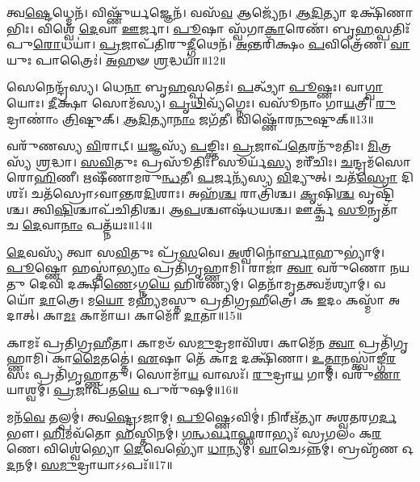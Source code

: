 𑌤𑍍𑌵\-\ul{𑌷𑍍𑌟𑍇}\-𑌧𑍍𑌮𑍇𑌨᳴। 
𑌵𑌿𑌷𑍍𑌣𑍁᳴𑌰𑍍\mbox{}\-\ul{𑌯}\-𑌜𑍍𑌞𑍇𑌨᳴। 
𑌵𑌸᳴\-\ul{𑌵} 𑌆𑌜𑍍𑌯𑍇᳴𑌨। 
\-\ul{𑌆}\-\-\ul{𑌦𑌿}\-𑌤𑍍𑌯𑌾 𑌦𑌕𑍍𑌷𑌿᳴𑌣𑌾𑌭𑌿𑌃। 
𑌵𑌿𑌶𑍍𑌵𑍇᳴ \ul{𑌦𑍇}\-𑌵𑌾 \ul{𑌊}\-𑌰𑍍𑌜𑌾। 
\-\ul{𑌪𑍂}\-𑌷𑌾 𑌸𑍍𑌵᳴𑌗𑌾\-\ul{𑌕𑌾}\-𑌰𑍇𑌣᳴। 
𑌬𑍃\-\ul{𑌹}\-𑌸𑍍𑌪𑌤𑌿𑌃᳴ 𑌪𑍁\-\ul{𑌰𑍋}\-𑌧𑌯𑌾॑। 
\-\ul{𑌪𑍍𑌰}\-𑌜𑌾𑌪᳴𑌤𑌿𑌰𑍁\-\ul{𑌦𑍍𑌗𑍀}\-𑌥𑍇𑌨᳴। 
\-\ul{𑌅}\-𑌨𑍍𑌤𑌰𑌿᳴𑌕𑍍𑌷𑌂 \ul{𑌪}\-𑌵𑌿𑌤𑍍𑌰𑍇᳴𑌣। 
\-\ul{𑌵𑌾}\-𑌯𑍁𑌃 𑌪𑌾𑌤𑍍𑌰𑍈𑌃॑। 
\-\ul{𑌅}\-𑌹𑍟 \ul{𑌶𑍍𑌰}\-𑌦𑍍𑌧𑌯𑌾॑॥12॥
\anuvakamend[\-\ul{𑌦𑍀}\-𑌕𑍍𑌷\-\ul{𑌯𑌾} 𑌪𑌾\-\ul{𑌤𑍍𑌰𑍈}\-𑌰𑍇𑌕𑌂᳴ 𑌚]

𑌸𑍇𑌨𑍇𑌨𑍍𑌦𑍍𑌰᳴𑌸𑍍𑌯। 
𑌧𑍇\-\ul{𑌨𑌾} 𑌬𑍃\-\ul{𑌹}\-𑌸𑍍𑌪𑌤𑍇𑌃॑। 
\-\ul{𑌪}\-𑌤𑍍𑌥𑍍𑌯𑌾᳴ \ul{𑌪𑍂}\-𑌷𑍍𑌣𑌃। 
𑌵𑌾\-\ul{𑌗𑍍𑌵𑌾}\-𑌯𑍋𑌃। 
\-\ul{𑌦𑍀}\-𑌕𑍍𑌷𑌾 𑌸𑍋𑌮᳴𑌸𑍍𑌯। 
\-\ul{𑌪𑍃}\-\-\ul{𑌥𑌿}\-𑌵𑍍𑌯᳴𑌗𑍍𑌨𑍇𑌃। 
𑌵𑌸𑍂᳴𑌨𑌾𑌂  𑌗𑌾\-\ul{𑌯}\-𑌤𑍍𑌰𑍀। 
\-\ul{𑌰𑍁}\-𑌦𑍍𑌰𑌾𑌣𑌾𑌂॑ \ul{𑌤𑍍𑌰𑌿}\-𑌷𑍍𑌟𑍁𑌕𑍍। 
\-\ul{𑌆}\-\-\ul{𑌦𑌿}\-𑌤𑍍𑌯𑌾\-\ul{𑌨𑌾𑌂} 𑌜𑌗᳴𑌤𑍀। 
𑌵𑌿𑌷𑍍𑌣𑍋᳴𑌰\-\ul{𑌨𑍁}\-𑌷𑍍𑌟𑍁𑌕𑍍॥13॥%

𑌵𑌰𑍁᳴𑌣𑌸𑍍𑌯 \ul{𑌵𑌿}\-𑌰𑌾𑌟𑍍। 
\-\ul{𑌯}\-𑌜𑍍𑌞𑌸𑍍𑌯᳴ \ul{𑌪}\-𑌙𑍍𑌕𑍍𑌤𑌿𑌃। 
\-\ul{𑌪𑍍𑌰}\-𑌜𑌾𑌪᳴\-\ul{𑌤𑍇}\-𑌰𑌨𑍁᳴𑌮𑌤𑌿𑌃। 
\-\ul{𑌮𑌿}\-𑌤𑍍𑌰𑌸𑍍𑌯᳴ \ul{𑌶𑍍𑌰}\-𑌦𑍍𑌧𑌾। 
\-\ul{𑌸}\-\-\ul{𑌵𑌿}\-𑌤𑍁𑌃 𑌪𑍍𑌰𑌸𑍂᳴𑌤𑌿𑌃। 
𑌸𑍂𑌰𑍍𑌯᳴\-\ul{𑌸𑍍𑌯} 𑌮𑌰𑍀᳴𑌚𑌿𑌃। 
\-\ul{𑌚}\-𑌨𑍍𑌦𑍍𑌰𑌮᳴𑌸𑍋 𑌰𑍋\-\ul{𑌹𑌿}\-𑌣𑍀। 
𑌋𑌷𑍀᳴𑌣𑌾𑌮𑌰𑍁\-\ul{𑌨𑍍𑌧}\-𑌤𑍀। 
\-\ul{𑌪}\-𑌰𑍍𑌜𑌨𑍍𑌯᳴𑌸𑍍𑌯 \ul{𑌵𑌿}\-𑌦𑍍𑌯𑍁𑌤𑍍। 
𑌚𑌤᳴\-\ul{𑌸𑍍𑌰𑍋} 𑌦𑌿𑌶𑌃᳴। 
𑌚𑌤᳴𑌸𑍍𑌰𑍋𑌽𑌵𑌾𑌨𑍍𑌤𑌰\-\ul{𑌦𑌿}\-𑌶𑌾𑌃। 
𑌅𑌹᳴\-\ul{𑌶𑍍𑌚} 𑌰𑌾𑌤𑍍𑌰𑌿᳴𑌶𑍍𑌚। 
\-\ul{𑌕𑍃}\-𑌷𑌿\-\ul{𑌶𑍍𑌚} 𑌵𑍃𑌷𑍍𑌟𑌿᳴𑌶𑍍𑌚। 
𑌤𑍍𑌵𑌿\-\ul{𑌷𑌿}\-𑌶𑍍𑌚𑌾𑌪᳴𑌚𑌿𑌤𑌿𑌶𑍍𑌚। 
𑌆\-\ul{𑌪}\-𑌶𑍍𑌚𑍗𑌷᳴𑌧𑌯𑌶𑍍𑌚। 
𑌊𑌰𑍍𑌕𑍍𑌚᳴ \ul{𑌸𑍂}\-𑌨𑍃𑌤𑌾᳴ 𑌚 \ul{𑌦𑍇}\-𑌵𑌾\-\ul{𑌨𑌾𑌂} 𑌪𑌤𑍍𑌨᳴𑌯𑌃॥14॥%
\anuvakamend[\-\ul{𑌅}\-\-\ul{𑌨𑍁}\-𑌷𑍍𑌟𑍁𑌗𑍍𑌦𑌿\-\ul{𑌶𑌃} 𑌷𑌟𑍍𑌚᳴]

\-\ul{𑌦𑍇}\-𑌵𑌸𑍍𑌯᳴ 𑌤𑍍𑌵𑌾 𑌸\-\ul{𑌵𑌿}\-𑌤𑍁𑌃 𑌪𑍍𑌰᳴\-\ul{𑌸}\-𑌵𑍇। 
\-\ul{𑌅}\-𑌶𑍍𑌵𑌿𑌨𑍋॑\-\ul{𑌰𑍍𑌬𑌾}\-𑌹𑍁𑌭𑍍𑌯𑌾॑𑌮𑍍। 
\-\ul{𑌪𑍂}\-𑌷𑍍𑌣𑍋 𑌹𑌸𑍍𑌤𑌾॑\-\ul{𑌭𑍍𑌯𑌾𑌂} 𑌪𑍍𑌰𑌤𑌿᳴𑌗𑍃𑌹𑍍𑌣𑌾𑌮𑌿। 
𑌰𑌾𑌜𑌾॑ \ul{𑌤𑍍𑌵𑌾} 𑌵𑌰𑍁᳴𑌣𑍋 𑌨𑌯𑌤𑍁 𑌦𑍇𑌵𑌿 𑌦𑌕𑍍𑌷𑌿\-\ul{𑌣𑍇}\-𑌽𑌗𑍍𑌨\-\ul{𑌯𑍇} 𑌹𑌿𑌰᳴𑌣𑍍𑌯𑌮𑍍। 
𑌤𑍇𑌨𑌾᳴𑌮𑍃\-\ul{𑌤}\-𑌤𑍍𑌵𑌮᳴𑌶𑍍𑌯𑌾𑌮𑍍। 
𑌵𑌯𑍋᳴ \ul{𑌦𑌾}\-𑌤𑍍𑌰𑍇। 
𑌮\-\ul{𑌯𑍋} 𑌮𑌹𑍍𑌯᳴𑌮𑌸𑍍𑌤𑍁 𑌪𑍍𑌰𑌤𑌿𑌗𑍍𑌰\-\ul{𑌹𑍀}\-𑌤𑍍𑌰𑍇। 
𑌕 \ul{𑌇}\-𑌦𑌂 𑌕𑌸𑍍𑌮𑌾᳴ 𑌅𑌦𑌾𑌤𑍍। 
𑌕𑌾\-\ul{𑌮𑌃} 𑌕𑌾𑌮𑌾᳴𑌯। 
𑌕𑌾𑌮𑍋᳴ \ul{𑌦𑌾}\-𑌤𑌾॥15॥

𑌕𑌾𑌮𑌃᳴ 𑌪𑍍𑌰𑌤𑌿𑌗𑍍𑌰\-\ul{𑌹𑍀}\-𑌤𑌾। 
𑌕𑌾𑌮𑍞᳴ 𑌸\-\ul{𑌮𑍁}\-𑌦𑍍𑌰𑌮𑌾𑌵𑌿᳴𑌶। 
𑌕𑌾𑌮𑍇᳴𑌨 \ul{𑌤𑍍𑌵𑌾} 𑌪𑍍𑌰𑌤𑌿᳴𑌗𑍃𑌹𑍍𑌣𑌾𑌮𑌿। 
𑌕𑌾\-\ul{𑌮𑍈}\-𑌤𑌤𑍍𑌤𑍇॑। 
\-\ul{𑌏}\-𑌷𑌾 𑌤𑍇᳴ 𑌕𑌾\-\ul{𑌮} 𑌦𑌕𑍍𑌷𑌿᳴𑌣𑌾। 
\-\ul{𑌉}\-\-\ul{𑌤𑍍𑌤𑌾}\-𑌨𑌸𑍍𑌤𑍍𑌵𑌾॑𑌙𑍍𑌗𑍀\-\ul{𑌰}\-𑌸𑌃 𑌪𑍍𑌰𑌤𑌿᳴𑌗𑍃𑌹𑍍𑌣𑌾𑌤𑍁। 
𑌸𑍋𑌮𑌾᳴\-\ul{𑌯} 𑌵𑌾𑌸𑌃᳴। 
\-\ul{𑌰𑍁}\-𑌦𑍍𑌰𑌾\-\ul{𑌯} 𑌗𑌾𑌮𑍍। 
𑌵𑌰𑍁᳴\-\ul{𑌣𑌾}\-𑌯𑌾𑌶𑍍𑌵𑌮𑍍॑। 
\-\ul{𑌪𑍍𑌰}\-𑌜𑌾𑌪᳴𑌤\-\ul{𑌯𑍇} 𑌪𑍁𑌰𑍁᳴𑌷𑌮𑍍॥16॥%

𑌮𑌨᳴\-\ul{𑌵𑍇} 𑌤𑌲𑍍𑌪𑌮𑍍॑। 
𑌤𑍍𑌵\-\ul{𑌷𑍍𑌟𑍍𑌰𑍇}\-𑌽𑌜𑌾𑌮𑍍। 
\-\ul{𑌪𑍂}\-𑌷𑍍𑌣𑍇𑌽𑌵𑌿𑌮𑍍॑। 
𑌨𑌿𑌰𑍍\mbox{}𑌋᳴𑌤𑍍𑌯𑌾 𑌅𑌶𑍍𑌵𑌤𑌰𑌗\-\ul{𑌰𑍍𑌦}\-𑌭𑍗। 
\-\ul{𑌹𑌿}\-𑌮𑌵᳴𑌤𑍋 \ul{𑌹}\-𑌸𑍍𑌤𑌿𑌨𑌮𑍍॑। 
\-\ul{𑌗}\-\-\ul{𑌨𑍍𑌧}\-\-\ul{𑌰𑍍𑌵𑌾}\-\-\ul{𑌫𑍍𑌸}\-𑌰𑌾𑌭𑍍𑌯𑌃᳴ 𑌸𑍍𑌰𑌗𑌲𑌂 𑌕\-\ul{𑌰}\-𑌣𑍇। 
𑌵𑌿𑌶𑍍𑌵𑍇॑𑌭𑍍𑌯𑍋 \ul{𑌦𑍇}\-𑌵𑍇𑌭𑍍𑌯𑍋᳴ \ul{𑌧𑌾}\-𑌨𑍍𑌯𑌮𑍍। 
\-\ul{𑌵𑌾}\-𑌚𑍇𑌽𑌨𑍍𑌨𑌮𑍍॑। 
𑌬𑍍𑌰𑌹𑍍𑌮᳴𑌣 𑌓\-\ul{𑌦}\-𑌨𑌮𑍍। 
\-\ul{𑌸}\-\-\ul{𑌮𑍁}\-𑌦𑍍𑌰𑌾𑌯𑌾𑌽𑌽𑌪𑌃᳴॥17॥


